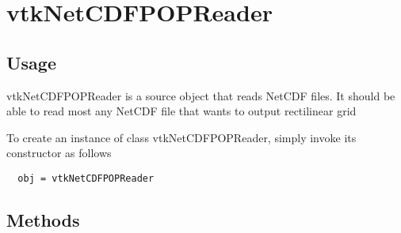 \section{vtkNetCDFPOPReader}

\subsection{Usage}

 vtkNetCDFPOPReader is a source object that reads NetCDF files.
 It should be able to read most any NetCDF file that wants to output rectilinear grid


To create an instance of class vtkNetCDFPOPReader, simply
invoke its constructor as follows
\begin{verbatim}
  obj = vtkNetCDFPOPReader
\end{verbatim}
\subsection{Methods}

